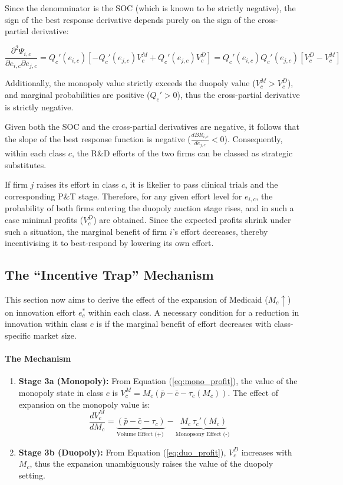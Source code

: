 \documentclass[12pt]{article}
\begin{document}
Since the denomninator is the SOC (which is known to be strictly negative), the sign of the best response derivative depends purely on the sign of the cross-partial derivative:

\begin{equation}
    \frac{\partial^2 \Psi_{i,c}}{\partial e_{i,c} \partial e_{j,c}} = Q_c'(e_{i,c}) \left[ -Q_c'(e_{j,c}) V_c^M + Q_c'(e_{j,c}) V_c^D \right] = Q_c'(e_{i,c}) Q_c'(e_{j,c}) [V_c^D - V_c^M]
\end{equation}

Additionally, the monopoly value strictly exceeds the duopoly value ($V_c^M > V_c^D$), and marginal probabilities are positive ($Q_c' > 0$), thus the cross-partial derivative is strictly negative. 

Given both the SOC and the cross-partial derivatives are negative, it follows that the slope of the best response function is negative ($\frac{d BR_{i,c}}{d e_{j,c}} < 0$). Consequently, within each class $c$, the R\&D efforts of the two firms can be classed as strategic substitutes. 

If firm $j$ raises its effort in class $c$, it is likelier to pass clinical trials and the corresponding P\&T stage. Therefore, for any given effort level for $e_{i,c}$, the probability of both firms entering the duopoly auction stage rises, and in such a case minimal profits ($V_c^D$) are obtained. Since the expected profits shrink under such a situation, the marginal benefit of firm $i$'s effort decreases, thereby incentivising it to best-respond by lowering its own effort.

\subsection{The ``Incentive Trap'' Mechanism}
This section now aims to derive the effect of the expansion of Medicaid ($M_c \uparrow$) on innovation effort $e_c^*$ within each class. A necessary condition for a reduction in innovation within class $c$ is if the marginal benefit of effort decreases with class-specific market size.

\paragraph{The Mechanism}
\begin{enumerate}
    \item \textbf{Stage 3a (Monopoly):} From Equation (\ref{eq:mono_profit}), the value of the monopoly state in class $c$ is $V_c^M = M_c(\bar{p} - \bar{c} - \tau_c(M_c))$. The effect of expansion on the monopoly value is:
    \begin{equation} \label{eq:dVM}
        \frac{d V_c^M}{d M_c} = \underbrace{(\bar{p} - \bar{c} - \tau_c)}_{\text{Volume Effect (+) }} - \underbrace{M_c \, \tau_c'(M_c)}_{\text{Monopsony Effect (-) }}
    \end{equation}
    \item \textbf{Stage 3b (Duopoly):} From Equation (\ref{eq:duo_profit}), $V_c^D$ increases with $M_c$, thus the expansion unambiguously raises the value of the duopoly setting.
\end{enumerate}
\end{document}
